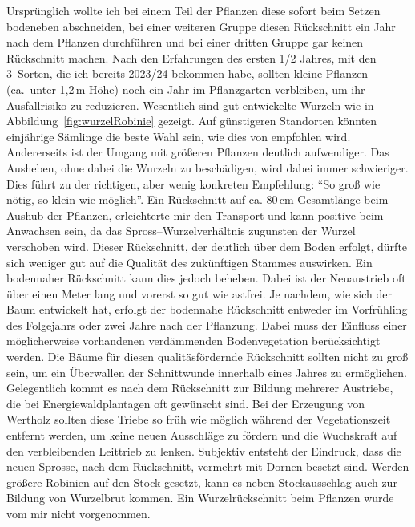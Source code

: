 \documentclass[twocolumn]{scrartcl}
\begin{document}
Ursprünglich wollte ich bei einem Teil der Pflanzen diese sofort beim
Setzen bodeneben abschneiden, bei einer weiteren Gruppe diesen
Rückschnitt ein Jahr nach dem Pflanzen durchführen und bei einer
dritten Gruppe gar keinen Rückschnitt machen. Nach den Erfahrungen des
ersten 1/2 Jahres, mit den 3~Sorten, die ich bereits 2023/24 bekommen
habe, sollten kleine Pflanzen (ca.\ unter 1,2\,m Höhe) noch ein Jahr
im Pflanzgarten verbleiben, um ihr Ausfallrisiko zu
reduzieren. Wesentlich sind gut entwickelte Wurzeln wie in
Abbildung~\ref{fig:wurzelRobinie} gezeigt. Auf günstigeren Standorten
könnten einjährige Sämlinge die beste Wahl sein, wie dies von
\citet{ciuvat2022robinieRumaenien} empfohlen wird.  Andererseits ist
der Umgang mit größeren Pflanzen deutlich aufwendiger.  Das Ausheben,
ohne dabei die Wurzeln zu beschädigen, wird dabei immer schwieriger.
Dies führt zu der richtigen, aber wenig konkreten Empfehlung:
\enquote{So groß wie nötig, so klein wie möglich}.  Ein Rückschnitt
auf ca. 80\,cm Gesamtlänge beim Aushub der Pflanzen, erleichterte mir
den Transport und kann positive beim Anwachsen sein, da das
Spross--Wurzelverhältnis zugunsten der Wurzel verschoben wird.  Dieser
Rückschnitt, der deutlich über dem Boden erfolgt, dürfte sich weniger
gut auf die Qualität des zukünftigen Stammes auswirken.  Ein
bodennaher Rückschnitt kann dies jedoch beheben. Dabei ist der
Neuaustrieb oft über einen Meter lang und vorerst so gut wie astfrei.
Je nachdem, wie sich der Baum entwickelt hat, erfolgt der bodennahe
Rückschnitt entweder im Vorfrühling des Folgejahrs oder zwei Jahre
nach der Pflanzung. Dabei muss der Einfluss einer möglicherweise
vorhandenen verdämmenden Bodenvegetation berücksichtigt werden. Die
Bäume für diesen qualitäsfördernde Rückschnitt sollten nicht zu groß
sein, um ein Überwallen der Schnittwunde innerhalb eines Jahres zu
ermöglichen. Gelegentlich kommt es nach dem Rückschnitt zur Bildung
mehrerer Austriebe, die bei Energiewaldplantagen oft gewünscht sind.
Bei der Erzeugung von Wertholz sollten diese Triebe so früh wie
möglich während der Vegetationszeit entfernt werden, um keine neuen
Ausschläge zu fördern und die Wuchskraft auf den verbleibenden
Leittrieb zu lenken. Subjektiv entsteht der Eindruck, dass die neuen
Sprosse, nach dem Rückschnitt, vermehrt mit Dornen besetzt sind.
Werden größere Robinien auf den Stock gesetzt, kann es neben
Stockausschlag auch zur Bildung von Wurzelbrut kommen. Ein
Wurzelrückschnitt beim Pflanzen wurde vom mir nicht vorgenommen.
\end{document}
